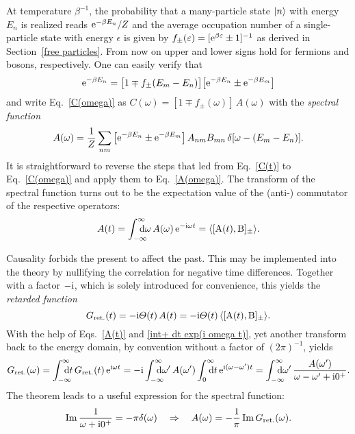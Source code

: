 At temperature $\beta^{-1}$, the probability that a many-particle state $|n\rangle$
with energy $E_n$ is realized reads $\mathrm e^{-\beta E_n} / Z$ and the average
occupation number of a single-particle state with energy $\epsilon$ is given by
$f_\pm(\varepsilon) = [\mathrm e^{\beta \varepsilon} \pm 1]^{-1}$ as derived in
Section~\ref{free particles}. From now on upper and lower signs hold for
fermions and bosons, respectively. One can easily verify that
%
\begin{equation*}
    \mathrm e^{-\beta E_n} =
    \big[ 1 \mp f_\pm(E_m - E_n) \big]
    \big[ \mathrm e^{-\beta E_n} \pm \mathrm e^{-\beta E_m} \big]
\end{equation*}
%
and write Eq.~\ref{C(omega)} as $C(\omega) = [1 \mp f_\pm(\omega)] \, A(\omega)$
with the \emph{spectral function}
%
\begin{equation} \label{A(omega)}
    A(\omega) = \frac 1 Z \sum_{n m} \big[
        \mathrm e^{-\beta E_n} \pm \mathrm e^{-\beta E_m}
    \big] \, A_{n m} B_{m n} \, \delta[\omega - (E_m - E_n)].
\end{equation}
%
It is straightforward to reverse the steps that led from Eq.~\ref{C(t)} to
Eq.~\ref{C(omega)} and apply them to Eq.~\ref{A(omega)}. The 
transform of the spectral function turns out to be the expectation value of the
(anti-) commutator of the respective operators:
%
\begin{equation} \label{A(t)}
    A(t) = \int \from{-\infty} \till \infty \D \omega \,
    A(\omega) \, \E^{-\I \omega t} =
    \av{[\op A(t), \op B]_\pm}.
\end{equation}

Causality forbids the present to affect the past. This may be implemented into
the theory by nullifying the correlation for negative time differences. Together
with a factor $-\mathrm i$, which is solely introduced for convenience, this yields the
\emph{retarded  function}
%
\begin{equation} \label{G_ret(t)}
    G \sb{\text{ret.}} (t) = -\mathrm i \varTheta(t) \, A(t) =
    -\mathrm i \varTheta(t) \, \langle[\mathrm A(t), \mathrm B]_\pm\rangle.
\end{equation}
%
With the help of Eqs.~\ref{A(t)} and \ref{int+ dt exp(i omega t)}, yet another
 transform back to the energy domain, by convention without a
factor of $(2 \pi)^{-1}$, yields
%
\begin{equation} \label{G_ret(omega)}
    G \sub{ret.} (\omega) = \int \from{-\infty} \till \infty \D t \,
    G \sub{ret.} (t) \, \E^{\I \omega t} = -\I
    \int \from{-\infty} \till \infty \D \omega' \, A(\omega')
    \int \from 0 \till \infty \D t \, \E^{\I (\omega - \omega') t} =
    \int \from{-\infty} \till \infty \D \omega' \,
    \frac{A(\omega')}{\omega - \omega' + \I 0^+}.
\end{equation}
%
The  theorem leads to a useful expression for the
spectral function:
%
\begin{equation} \label{spectral representation}
	\operatorname{Im} \frac 1 {\omega + \mathrm i 0^+} = -\pi \delta(\omega)
    \quad \Rightarrow \quad
    A(\omega) = -\frac 1 \pi \operatorname{Im} G \sb{\text{ret.}} (\omega).
\end{equation}

